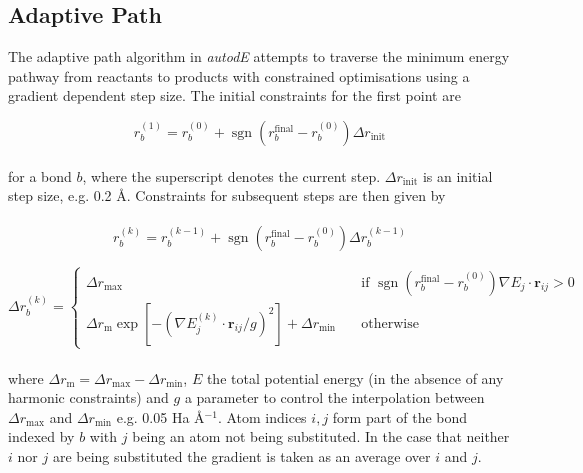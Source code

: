 \documentclass[10pt]{article}
\DeclareMathOperator{\sgn}{sgn}
\begin{document}
\subsection{Adaptive Path}

The adaptive path algorithm in \emph{autodE} attempts to traverse the minimum energy pathway from reactants to products with constrained optimisations using a gradient dependent step size. The initial constraints for the first point are

\begin{equation}
r_b^{(1)} = r_b^{(0)} + \sgn(r_b^\text{final} - r_b^{(0)})\Delta r_\text{init}
\end{equation}
\\
for a bond $b$, where the superscript denotes the current step. $\Delta r_\text{init}$ is an initial step size, e.g. 0.2 Å. Constraints for subsequent steps are then given by
\\\\
\begin{equation}
r_b^{(k)} = r_b^{(k-1)} + \sgn(r_b^\text{final} - r_b^{(0)})\Delta r_b^{(k-1)}
\end{equation}

\begin{equation}
\Delta r_b^{(k)} =
\begin{cases}
\Delta r_\text{max} \quad &\text{if } \sgn(r_b^\text{final} - r_b^{(0)}) \nabla E_{j} \cdot \boldsymbol{r}_{ij} > 0 \\
\Delta r_\text{m}\exp\left[-\left({\nabla E_{j}^{(k)} \cdot \boldsymbol{r}_{ij}}/{g} \right)^2\right] + \Delta r_\text{min} \quad &\text{otherwise}
\end{cases}
\end{equation}
\\
where $\Delta r_\text{m} = \Delta r_\text{max} - \Delta r_\text{min}$, $E$ the total potential energy (in the absence of any harmonic constraints) and $g$ a parameter to control the interpolation between $\Delta r_\text{max}$ and $\Delta r_\text{min}$ e.g. 0.05 Ha Å$^{-1}$. Atom indices $i, j$ form part of the bond indexed by $b$ with $j$ being an atom not being substituted. In the case that neither $i$ nor $j$ are being substituted the gradient is taken as an average over $i$ and $j$.
\end{document}
